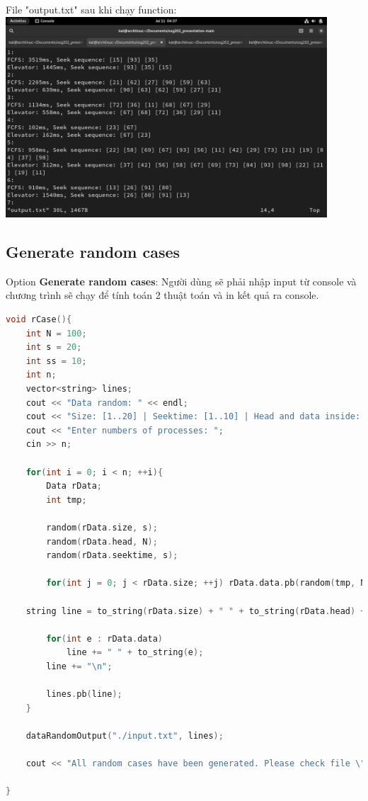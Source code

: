 \documentclass{report}
\begin{document}
            File "output.txt" sau khi chạy function:\\
            \includegraphics[width=12cm]{images/outputtxt.png}
                        
        \subsection{Generate random cases}
            
            Option \textbf{Generate random cases}:
            Người dùng sẽ phải nhập input từ console và chương trình sẽ chạy để tính toán 2 thuật toán và in kết quả ra console.

            \begin{lstlisting}[language=C++, caption=Generate random cases Function]
void rCase(){
    int N = 100;
    int s = 20;
    int ss = 10;
    int n;
    vector<string> lines;
    cout << "Data random: " << endl;
    cout << "Size: [1..20] | Seektime: [1..10] | Head and data inside: [1..100]" << endl;;
    cout << "Enter numbers of processes: ";
    cin >> n;

    for(int i = 0; i < n; ++i){
        Data rData;
        int tmp;

        random(rData.size, s);
        random(rData.head, N);
        random(rData.seektime, s);	
 
        for(int j = 0; j < rData.size; ++j) rData.data.pb(random(tmp, N));

	string line = to_string(rData.size) + " " + to_string(rData.head) + " " + to_string(rData.seektime);
 
        for(int e : rData.data)
            line += " " + to_string(e);
        line += "\n";
 
        lines.pb(line);
    }

    dataRandomOutput("./input.txt", lines);

    cout << "All random cases have been generated. Please check file \"input.txt\" to have more infomation." << endl;

}
            \end{lstlisting}
\end{document}

